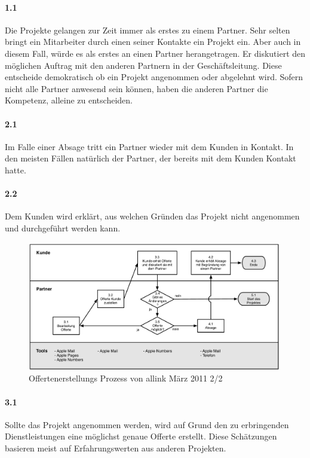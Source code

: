 \paragraph{1.1}
Die Projekte gelangen zur Zeit immer als erstes zu einem Partner. Sehr selten
bringt ein Mitarbeiter durch einen seiner Kontakte ein Projekt ein. Aber auch in
diesem Fall, würde es als erstes an einen Partner herangetragen.
Er diskutiert den möglichen Auftrag mit den anderen Partnern in der Geschäftsleitung.
Diese entscheide demokratisch ob ein Projekt angenommen oder abgelehnt wird. 
Sofern nicht alle Partner anwesend sein können, haben die anderen Partner
die Kompetenz, alleine zu entscheiden.

\paragraph{2.1}
Im Falle einer Absage tritt ein Partner wieder mit dem Kunden in Kontakt.
In den meisten Fällen natürlich der Partner, der bereits mit dem Kunden Kontakt
hatte.

\paragraph{2.2}
Dem Kunden wird erklärt, aus welchen Gründen das Projekt nicht angenommen
und durchgeführt werden kann.

\begin{figure}[htbp]
\begin{center}
\includegraphics[width=0.99\textwidth,angle=0]{./bilder/01_ist_prozesse_offerte_02.pdf}
\caption{Offertenerstellungs Prozess von allink März 2011 2/2}
\label{pic:01_ist_prozesse_offerte_02}
\end{center}
\end{figure}

\paragraph{3.1}
Sollte das Projekt angenommen werden, wird auf Grund den zu erbringenden
Dienstleistungen eine möglichst genaue Offerte erstellt. Diese Schätzungen
basieren meist auf Erfahrungswerten aus anderen Projekten.

